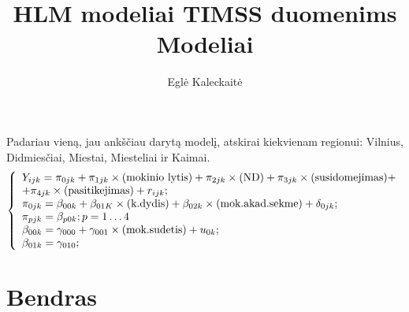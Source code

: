 \documentclass[a4paper]{article}
\title{HLM modeliai TIMSS duomenims\\Modeliai}
\author{Eglė Kaleckaitė}
\begin{document}


\maketitle
Padariau vieną, jau ankščiau darytą modelį, atskirai kiekvienam regionui: Vilnius, Didmiesčiai, Miestai, Miesteliai ir Kaimai.
\[ \left\{
  \begin{array}{l l}
    Y_{ijk} = \pi_{0jk}+\pi_{1jk} \times \text{(mokinio lytis)} + \pi_{2jk} \times \text{(ND)}+\pi_{3jk} \times \text{(susidomejimas)}+\\
+\pi_{4jk} \times \text{(pasitikejimas)}+r_{ijk}; \\
    \pi_{0jk} = \beta_{00k} + \beta_{01K}\times \text{(k.dydis)}+\beta_{02k}\times \text{(mok.akad.sekme)}+\delta_{0jk};\\
    \pi_{pjk}= \beta_{p0k}; p = 1 \dots 4\\
    \beta_{00k} = \gamma_{000} + \gamma_{001} \times \text{(mok.sudetis)}+ u_{0k};\\
    \beta_{01k}=\gamma_{010};
  \end{array} \right.\]
\section{Bendras}
\end{document}
